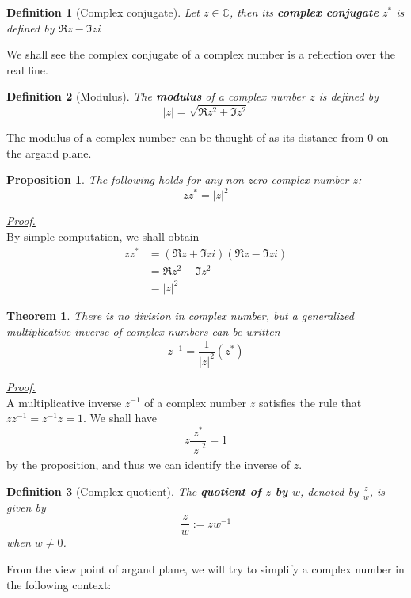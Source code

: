 \documentclass[12pt]{article}
\newtheorem{definition}{Definition}[section]
\newtheorem*{theorem}{Theorem}
\newtheorem*{proposition}{Proposition}
\renewenvironment{proof}[1][Proof]{\begin{snugshade*} \underline{\textit{{#1}.}}\\}{\hfill \qedsymbol \end{snugshade*}}
\begin{document}
    \begin{definition}[Complex conjugate]
        Let $z\in\mathbb{C}$, then its \textbf{complex conjugate} $z^*$ is defined by $\Re{z}-\Im{z}i$
    \end{definition}

    We shall see the complex conjugate of a complex number is a reflection over the real line.
    
    \begin{definition}[Modulus]
        The \textbf{modulus} of a complex number $z$ is defined by \[|z|=\sqrt{\Re{z}^2+\Im{z}^2}\]
    \end{definition}

    The modulus of a complex number can be thought of as its distance from 0 on the argand plane.

    \begin{proposition}
        The following holds for any non-zero complex number $z$:\[z z^* = |z|^2\]
    \end{proposition}

    \begin{proof}
        By simple computation, we shall obtain \begin{align*}
            z z^* &= (\Re{z}+\Im{z}i)(\Re{z}-\Im{z}i)\\
            &=\Re{z}^2+\Im{z}^2\\
            &=|z|^2
        \end{align*}
    \end{proof}

    \begin{theorem}
        There is no division in complex number, but a generalized multiplicative inverse of complex numbers can be written \[z^{-1}=\frac{1}{|z|^2}(z^*)\]
    \end{theorem}

    \begin{proof}
        A multiplicative inverse $z^{-1}$ of a complex number $z$ satisfies the rule that $z z^{-1}=z^{-1}z=1$. We shall have \[z\frac{z^*}{|z|^2}=1\] by the proposition, and thus we can identify the inverse of $z$.
    \end{proof}

    \begin{definition}[Complex quotient]
        The \textbf{quotient of $z$ by $w$}, denoted by $\frac{z}{w}$, is given by \[\frac{z}{w}:=zw^{-1}\] when $w\neq 0$.
    \end{definition}

    From the view point of argand plane, we will try to simplify a complex number in the following context:
\end{document}
